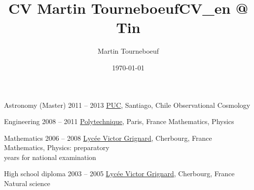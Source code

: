 \def\tbflanguage{english}

\ifx\HCode\undefined
  \providecommand\tbfbordertop{1.2}
  \providecommand\tbfborderleft{0.7}
  \providecommand\tbfwidth{12.4}
\else
  \providecommand\tbfbordertop{1}
  \providecommand\tbfborderleft{0.7}
  \providecommand\tbfwidth{12.4}
\fi

\ifx\HCode\undefined

%
\else

%
\fi

\ifx\HCode\undefined
  \title{CV Martin Tourneboeuf}
\else
  \title{CV_en @ Tin}
\fi
\author{Martin Tourneboeuf}
\date{\today}









\begin{coordinatelist}
\end{coordinatelist}



\pgfmathsetmacro{\tbfyeary}{\tbfbordertop+3.1}

\begin{yearlist}[7.7][\tbfborderleft][\tbfyeary]


\item[Astronomy (Master)]{2011 -- 2013}
  {
  \href{http://www.uc.cl/}{PUC}, Santiago, Chile
  }
  {   Observational Cosmology}


\item[Engineering]{2008 -- 2011}
  {
  \tbfix
  \href{https://www.polytechnique.edu/}{Polytechnique}, Paris, France
  }
  {    Mathematics, Physics}


\item[Mathematics]{2006 -- 2008}
  {
  \href{http://www.lycee-grignard.fr/}{Lyc\'ee Victor Grignard}, Cherbourg, France
  }
  {    Mathematics, Physics: preparatory \\ years for national examination}


\item[High school diploma]{2003 -- 2005}
  {
  \href{http://www.lycee-grignard.fr/}{Lyc\'ee Victor Grignard}, Cherbourg, France
  }
  {    Natural science}

\end{yearlist}



